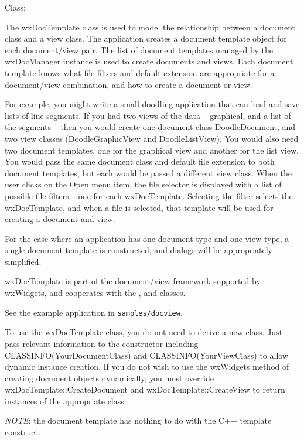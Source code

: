 
Class: 

The wxDocTemplate class is used to model the relationship between a
document class and a view class. The application creates a document
template object for each document/view pair. The list of document
templates managed by the wxDocManager instance is used to create
documents and views. Each document template knows what file filters
and default extension are appropriate for a document/view combination,
and how to create a document or view.

For example, you might write a small doodling application that can load
and save lists of line segments. If you had two views of the data -- graphical,
and a list of the segments -- then you would create one document class DoodleDocument,
and two view classes (DoodleGraphicView and DoodleListView). You would also
need two document templates, one for the graphical view and another for the
list view. You would pass the same document class and default file extension to both
document templates, but each would be passed a different view class. When
the user clicks on the Open menu item, the file selector is displayed
with a list of possible file filters -- one for each wxDocTemplate. Selecting
the filter selects the wxDocTemplate, and when
a file is selected, that template will be used for creating a document
and view.

For the case where an application has one document type and one view type,
a single document template is constructed, and dialogs will be appropriately
simplified.

wxDocTemplate is part of the document/view framework supported by wxWidgets,
and cooperates with the , 
and  classes.

See the example application in {\tt samples/docview}.

To use the wxDocTemplate class, you do not need to derive a new class.
Just pass relevant information to the constructor including CLASSINFO(YourDocumentClass) and
CLASSINFO(YourViewClass) to allow dynamic instance creation.
If you do not wish to use the wxWidgets method of creating document
objects dynamically, you must override wxDocTemplate::CreateDocument
and wxDocTemplate::CreateView to return instances of the appropriate class.

{\it NOTE}: the document template has nothing to do with the C++ template construct.

